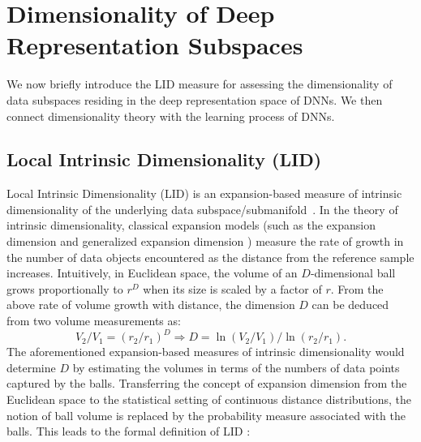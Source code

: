 \documentclass{article}
\begin{document}
\section{Dimensionality of Deep Representation Subspaces}
We now briefly introduce the LID measure for assessing the dimensionality of data subspaces residing in the deep representation space of DNNs. We then connect dimensionality theory with the learning process of DNNs.

\subsection{Local Intrinsic Dimensionality (LID)}
Local Intrinsic Dimensionality (LID) is an expansion-based measure of intrinsic dimensionality of the underlying data subspace/submanifold~\cite{houle2017local1}. 
In the theory of intrinsic dimensionality, classical
expansion models (such as the expansion dimension \cite{karger2002finding} and generalized expansion dimension \cite{HouleKN12}) measure the rate of growth in the number of data objects encountered as the distance from the reference sample increases. Intuitively, in Euclidean space, the volume of an $D$-dimensional ball grows proportionally to $r^D$ when its size is scaled by a factor of $r$. From the above rate of volume growth with distance, the dimension $D$ can be deduced from two volume measurements as: 
\begin{equation}
V_2/V_1 = (r_2/r_1)^D \Rightarrow D = \ln(V_2/V_1)/\ln(r_2/r_1).   
\end{equation}
The aforementioned expansion-based measures of intrinsic dimensionality would determine $D$ by estimating the volumes in terms of the numbers of data points captured by the balls. Transferring the concept of expansion dimension from the Euclidean space to the statistical setting of continuous distance distributions, the notion of ball volume is replaced by the probability measure associated with the balls. This leads to the formal definition of LID \cite{houle2017local1}:

\end{document}
